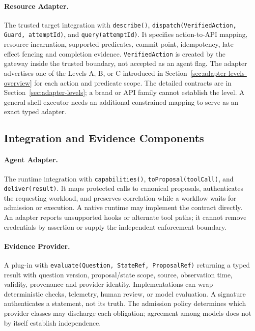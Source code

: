\paragraph{Resource Adapter.}
The trusted target integration with \texttt{describe()}, \texttt{dispatch(VerifiedAction, Guard, attemptId)}, and \texttt{query(attemptId)}. It specifies action-to-API mapping, resource incarnation, supported predicates, commit point, idempotency, late-effect fencing and completion evidence. \texttt{VerifiedAction} is created by the gateway inside the trusted boundary, not accepted as an agent flag. The adapter advertises one of the Levels A, B, or C introduced in Section~\ref{sec:adapter-levels-overview} for each action and predicate scope. The detailed contracts are in Section~\ref{sec:adapter-levels}; a brand or API family cannot establish the level. A general shell executor needs an additional constrained mapping to serve as an exact typed adapter.

\subsection{Integration and Evidence Components}
\paragraph{Agent Adapter.}
The runtime integration with \texttt{capabilities()}, \texttt{toProposal(toolCall)}, and \texttt{deliver(result)}. It maps protected calls to canonical proposals, authenticates the requesting workload, and preserves correlation while a workflow waits for admission or execution. A native runtime may implement the contract directly. An adapter reports unsupported hooks or alternate tool paths; it cannot remove credentials by assertion or supply the independent enforcement boundary.

\paragraph{Evidence Provider.}
A plug-in with \texttt{evaluate(Question, StateRef, ProposalRef)} returning a typed result with question version, proposal/state scope, source, observation time, validity, provenance and provider identity. Implementations can wrap deterministic checks, telemetry, human review, or model evaluation. A signature authenticates a statement, not its truth. The admission policy determines which provider classes may discharge each obligation; agreement among models does not by itself establish independence.

